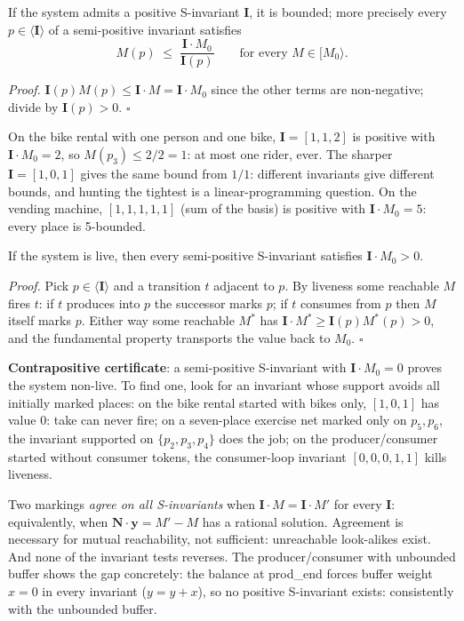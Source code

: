 \begin{theorem}
If the system admits a positive S-invariant $\mathbf{I}$, it is bounded; more precisely every $p \in \langle \mathbf{I} \rangle$ of a semi-positive invariant satisfies
\[
  M(p) \;\leq\; \frac{\mathbf{I} \cdot M_0}{\mathbf{I}(p)} \qquad \text{for every } M \in [M_0\rangle.
\]
\end{theorem}
\textit{Proof.} $\mathbf{I}(p) M(p) \leq \mathbf{I} \cdot M = \mathbf{I} \cdot M_0$ since the other terms are non-negative; divide by $\mathbf{I}(p) > 0$. \hfill$\square$

On the bike rental with one person and one bike, $\mathbf{I} = [1,1,2]$ is positive with $\mathbf{I} \cdot M_0 = 2$, so $M(p_3) \leq 2/2 = 1$: at most one rider, ever. The sharper $\mathbf{I} = [1,0,1]$ gives the same bound from $1/1$: different invariants give different bounds, and hunting the tightest is a linear-programming question. On the vending machine, $[1,1,1,1,1]$ (sum of the basis) is positive with $\mathbf{I} \cdot M_0 = 5$: every place is 5-bounded.

\begin{theorem}
If the system is live, then every semi-positive S-invariant satisfies $\mathbf{I} \cdot M_0 > 0$.
\end{theorem}
\textit{Proof.} Pick $p \in \langle \mathbf{I} \rangle$ and a transition $t$ adjacent to $p$. By liveness some reachable $M$ fires $t$: if $t$ produces into $p$ the successor marks $p$; if $t$ consumes from $p$ then $M$ itself marks $p$. Either way some reachable $M^*$ has $\mathbf{I} \cdot M^* \geq \mathbf{I}(p) M^*(p) > 0$, and the fundamental property transports the value back to $M_0$. \hfill$\square$

\textbf{Contrapositive certificate}: a semi-positive S-invariant with $\mathbf{I} \cdot M_0 = 0$ proves the system non-live. To find one, look for an invariant whose support avoids all initially marked places: on the bike rental started with bikes only, $[1,0,1]$ has value 0: \textsf{take} can never fire; on a seven-place exercise net marked only on $p_5, p_6$, the invariant supported on $\{p_2, p_3, p_4\}$ does the job; on the producer/consumer started without consumer tokens, the consumer-loop invariant $[0,0,0,1,1]$ kills liveness.

Two markings \emph{agree on all S-invariants} when $\mathbf{I} \cdot M = \mathbf{I} \cdot M'$ for every $\mathbf{I}$: equivalently, when $\mathbf{N} \cdot \mathbf{y} = M' - M$ has a rational solution. Agreement is necessary for mutual reachability, not sufficient: unreachable look-alikes exist. And none of the invariant tests reverses. The producer/consumer with unbounded buffer shows the gap concretely: the balance at \textsf{prod\_end} forces buffer weight $x = 0$ in every invariant ($y = y + x$), so no positive S-invariant exists: consistently with the unbounded buffer.

